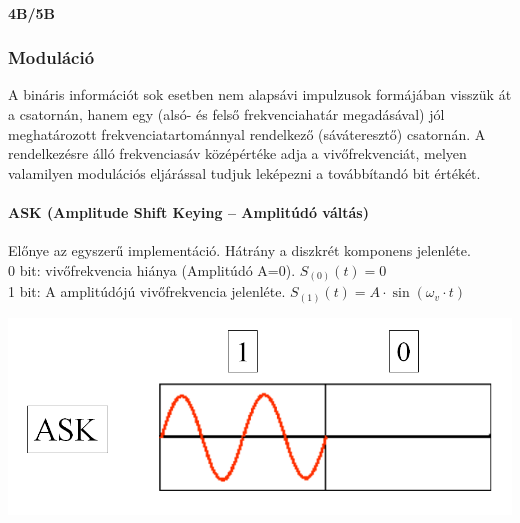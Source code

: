 \paragraph{4B/5B}

\subsubsection{Moduláció}
A bináris információt sok esetben nem alapsávi impulzusok formájában visszük át a csatornán, hanem egy (alsó- és felső frekvenciahatár megadásával) jól meghatározott frekvenciatartománnyal rendelkező (sáváteresztő) csatornán. A rendelkezésre álló frekvenciasáv középértéke adja a vivőfrekvenciát, melyen valamilyen modulációs eljárással tudjuk leképezni a továbbítandó bit értékét.

\begin{multicols}{2}
\paragraph{ASK (Amplitude Shift Keying -- Amplitúdó váltás)} Előnye az egyszerű implementáció. Hátrány a diszkrét komponens jelenléte.\\
0 bit: vivőfrekvencia hiánya (Amplitúdó A=0). $S_{(0)}(t) = 0$\\
1 bit: A amplitúdójú vivőfrekvencia jelenléte. $S_{(1)}(t) = A\cdot\sin(\omega_v\cdot t) $\\
\begin{center}
	\includegraphics[width=\linewidth]{fig/12-ASK}
\end{center}
\end{multicols}

